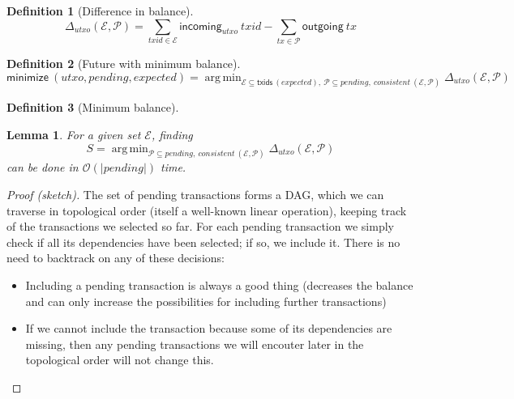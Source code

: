 \documentclass{article}
\newcommand{\order}[1]{\mathcal{O}\left(#1\right)}
\DeclareMathOperator*{\argmin}{arg\,min} %
\newtheorem{lemma}{Lemma}
\newtheorem{definition}{Definition}
\begin{document}
\begin{definition}[Difference in balance]
\begin{equation*}
  \Delta_\mathit{utxo}(\mathcal{E}, \mathcal{P})
= \sum_{\mathit{txid} \in \mathcal{E}} \mathsf{incoming}_\mathit{utxo} ~ \mathit{txid}
- \sum_{\mathit{tx} \in \mathcal{P}} \mathsf{outgoing} ~ \mathit{tx}
\end{equation*}
\end{definition}

\begin{definition}[Future with minimum balance]

\begin{equation*}
  \mathsf{minimize} ~ (\mathit{utxo}, \mathit{pending}, \mathit{expected})
= \argmin_{\mathcal{E} \subseteq \mathsf{txids} ~ (\mathit{expected}) ,~
           \mathcal{P} \subseteq \mathit{pending} ,~
           \mathit{consistent} ~ (\mathcal{E}, \mathcal{P})
          }
  \Delta_\mathit{utxo} (\mathcal{E}, \mathcal{P})
\end{equation*}
\end{definition}

\begin{definition}[Minimum balance]
\end{definition}

\begin{lemma}
For a given set $\mathcal{E}$, finding
%
\begin{equation*}
S = \argmin_{\mathcal{P} \subseteq \mathit{pending} ,~
           \mathit{consistent} ~ (\mathcal{E}, \mathcal{P})
          }
    \Delta_\mathit{utxo} (\mathcal{E}, \mathcal{P})
\end{equation*}
%
can be done in $\order{|\mathit{pending}|}$ time.
\end{lemma}

\begin{proof}[Proof (sketch)]
The set of pending transactions forms a DAG, which we can traverse in
topological order (itself a well-known linear operation), keeping track of the
transactions we selected so far. For each pending transaction we simply check if
all its dependencies have been selected; if so, we include it. There is no need
to backtrack on any of these decisions:

\begin{itemize}
\item Including a pending transaction is always a good thing (decreases the
balance and can only increase the possibilities for  including further
transactions)
\item If we cannot include the transaction because some of its dependencies
are missing, then any pending transactions we will encouter later in the
topological order will not change this.
\end{itemize}
\end{proof}
\end{document}
